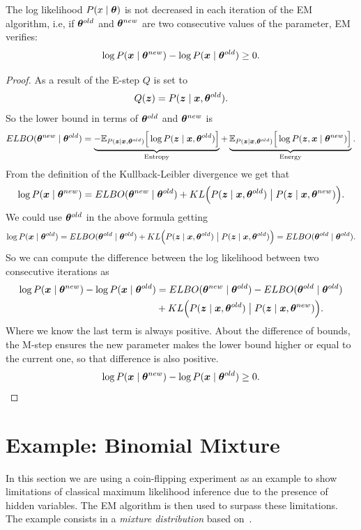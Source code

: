 \begin{proposition}
  The log likelihood \(P(x \mid \bm{\theta})\) is not decreased in each iteration of the EM algorithm, i.e, if \(\bm{\theta}^{old}\) and \(\bm{\theta}^{new}\) are two consecutive values of the parameter, EM verifies:
  \[
    \log{P(\bm{x}\mid \bm{\theta}^{new})} - \log{P(\bm{x}\mid \bm{\theta}^{old})} \geq 0.
  \]
\end{proposition}
\begin{proof}
As a result of the E-step \(Q\) is set to
\[
  Q(\bm{z}) = P(\bm{z} \mid \bm{x}, \bm{\theta}^{old}).
\]
So the lower bound in terms of \(\bm{\theta}^{old}\) and \(\bm{\theta}^{new}\) is
\[
  ELBO(\bm{\theta}^{new} \mid \bm{\theta}^{old}) =  \underbrace{-\mathbb{E}_{P(\bm{z} \mid \bm{x}, \bm{\theta}^{old})}\Big[\log{P(\bm{z}\mid \bm{x}, \bm{\theta}^{old})}\Big]}_{\text{Entropy}} + \underbrace{\mathbb{E}_{P(\bm{z} \mid \bm{x}, \bm{\theta}^{old})}\Big[\log{P(\bm{z},\bm{x}\mid \bm{\theta}^{new})}\Big]}_{\text{Energy}}.
\]
From the definition of the Kullback-Leibler divergence we get that
\[
  \log{P(\bm{x}\mid \bm{\theta}^{new})} = ELBO(\bm{\theta}^{new}\mid \bm{\theta}^{old}) + KL\Big(P(\bm{z} \mid \bm{x}, \bm{\theta}^{old}) \bigm| P(\bm{z} \mid \bm{x}, \bm{\theta}^{new})\Big).
\]
We could use \(\bm{\theta}^{old}\) in the above formula getting
\[
  \log{P(\bm{x}\mid \bm{\theta}^{old})} = ELBO(\bm{\theta}^{old} \mid \bm{\theta}^{old}) + KL\Big(P(\bm{z} \mid \bm{x}, \bm{\theta}^{old}) \bigm| P(\bm{z} \mid \bm{x}, \bm{\theta}^{old})\Big) = ELBO(\bm{\theta}^{old} \mid \bm{\theta}^{old}).
\]
So we can compute the difference between the log likelihood between two consecutive iterations as
\[
  \begin{aligned}
    \log{P(\bm{x}\mid \bm{\theta}^{new})} - \log{P(\bm{x}\mid \bm{\theta}^{old})} &= ELBO(\bm{\theta}^{new}\mid \bm{\theta}^{old}) - ELBO(\bm{\theta}^{old} \mid \bm{\theta}^{old})\\
    &+  KL\Big(P(\bm{z} \mid \bm{x}, \bm{\theta}^{old}) \bigm| P(\bm{z} \mid \bm{x}, \bm{\theta}^{new})\Big).
  \end{aligned}
\]
Where we know the last term is always positive. About the difference of bounds, the M-step ensures the new parameter makes the lower bound higher or equal to the current one, so that difference is also positive.
\[
   \log{P(\bm{x}\mid \bm{\theta}^{new})} - \log{P(\bm{x}\mid \bm{\theta}^{old})} \geq 0.
 \]
\end{proof}


\section{Example: Binomial Mixture}
In this section we are using a coin-flipping experiment as an example to show limitations of classical maximum likelihood inference due to the presence of hidden variables. The EM algorithm is then used to surpass these limitations. The example consists in a \emph{mixture distribution} based on~\cite{do2008expectation}.


